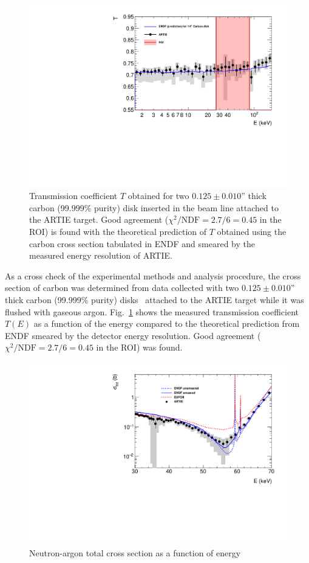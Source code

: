 \documentclass[%
 reprint,
superscriptaddress,
 preprintnumbers,
 nofootinbib,
 nobibnotes,
 bibnotes,
 amsmath,amssymb,
 aps,
 prl, 
 floatfix,
]{revtex4-1}
\begin{document}
\begin{figure}[htbp]\centering
\includegraphics[width=\linewidth]{Figures/carbon.pdf}
\caption{Transmission coefficient $T$ obtained for two $0.125\pm 0.010$” thick carbon (99.999\% purity) disk inserted in the beam line attached to the ARTIE target. Good agreement ($\chi^{2}/\text{NDF} = 2.7 / 6 = 0.45$ in the ROI) is found with the theoretical prediction of $T$ obtained using the carbon cross section tabulated in ENDF and smeared by the measured energy resolution of ARTIE.}
\label{fig:carbon}
\end{figure}

As a cross check of the experimental methods and analysis procedure,
the cross section of carbon was determined from data collected with
two $0.125\pm 0.010$” thick carbon (99.999\% purity)
disks~\cite{CarbonLesker} attached to the ARTIE target while it was
flushed with gaseous argon.  Fig.~\ref{fig:carbon} shows the
measured transmission coefficient $T(E)$ as a function of the energy
compared to the theoretical prediction from ENDF smeared by the
detector energy resolution.  Good agreement
($\chi^{2}/\text{NDF} = 2.7 / 6 = 0.45$
in the ROI) was found.

\begin{figure}[h!]
    \centering
    \includegraphics[width=\linewidth]{Figures/cross-section.pdf}
    \caption{Neutron-argon total cross section as a function of energy}
    \label{fig:results}
\end{figure}
\end{document}
